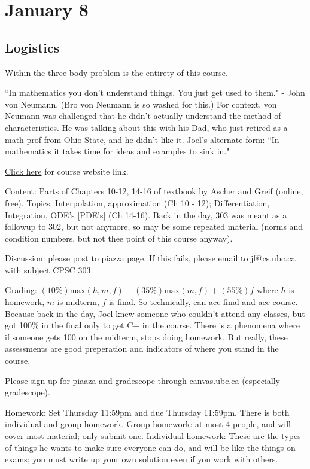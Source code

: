 \documentclass{article}
\theoremstyle{plain}
\theoremstyle{remark}
\begin{document}
\section{January 8}
\subsection{Logistics}
Within the three body problem is the entirety of this course.

``In mathematics you don't understand things. You just get used to them." - John von Neumann.
(Bro von Neumann is so washed for this.)
For context, von Neumann was challenged that he didn't actually understand
the method of characteristics.
He was talking about this with his Dad, who just retired as a math prof from Ohio State,
and he didn't like it.
Joel's alternate form: ``In mathematics it takes time for ideas and examples to sink in."

\href{https://www.cs.ubc.ca/~jf/courses/303.S2024/index.html}{Click here} for course website link.

Content:
Parts of Chapters 10-12, 14-16 of textbook by Ascher and Greif (online, free).
Topics: Interpolation, approximation (Ch 10 - 12);
Differentiation, Integration, ODE's [PDE's] (Ch 14-16).
Back in the day, 303 was meant as a followup to 302, but not anymore,
so may be some repeated material
(norms and condition numbers, but not thee point of this course anyway).

Discussion: please post to piazza page.
If this fails, please email to jf@cs.ubc.ca with subject CPSC 303.

Grading: $(10\%)\mathrm{max}(h,m,f) + (35\%)\mathrm{max}(m,f) + (55\%)f$
where $h$ is homework, $m$ is midterm, $f$ is final.
So technically, can ace final and ace course.
Because back in the day, Joel knew someone who couldn't attend any classes,
but got 100\% in the final only to get C+ in the course.
There is a phenomena where if someone gets 100 on the midterm,
stops doing homework.
But really, these assessments are good preperation and indicators of where you stand in the course.

Please sign up for piaaza and gradescope through canvas.ubc.ca (especially gradescope).

Homework: Set Thursday 11:59pm and due Thursday 11:59pm.
There is both individual and group homework.
Group homework: at most 4 people, and will cover most material; only submit one.
Individual homework: These are the types of things he wants to make sure everyone can do,
and will be like the things on exams;
you must write up your own solution even if you work with others.
\end{document}
